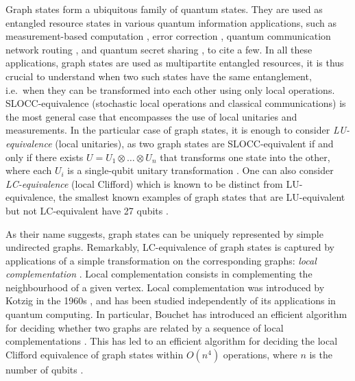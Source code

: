 \documentclass[a4paper,UKenglish,cleveref,autoref,thm-restate]{arxiv}
\begin{document}
Graph states form a ubiquitous family of quantum states. They are used as entangled resource states in various quantum information applications, such as measurement-based computation \cite{raussendorf2001one, raussendorf2003measurement, briegel2009measurement}, error correction \cite{schlingemann2001quantum,schlingemann2001stabilizer,cross2008codeword,sarvepalli2011local}, quantum communication network routing \cite{hahn2019quantum,meignant2019distributing, bravyi2024generating, Cautres2024}, and quantum secret sharing \cite{markham2008graph,gravier2013quantum},  to cite a few.  
In all these applications, graph states are used as multipartite entangled resources, it is thus crucial to understand when two such states have the same entanglement, i.e.~when they can be transformed into each other using only local operations. SLOCC-equivalence (stochastic local operations and classical communications) is the most general case that encompasses the use of local unitaries and measurements. In the particular case of graph states, it is enough to consider \emph{LU-equivalence} (local unitaries), as two graph states are SLOCC-equivalent if and only if there exists $U=U_1\otimes \ldots \otimes U_n$ that transforms one state into the other, where each $U_i$ is a single-qubit unitary transformation \cite{Hein04}. One can also consider \emph{LC-equivalence} (local Clifford) which is known to be distinct from LU-equivalence, the smallest known examples of graph states that are LU-equivalent but not LC-equivalent have 27 qubits \cite{Ji07,Tsimakuridze17}. 

As their name suggests, graph states can be uniquely represented by simple undirected graphs. Remarkably, LC-equivalence of graph states is captured by applications of a simple transformation on the corresponding graphs: \emph{local complementation} \cite{VandenNest04}. Local complementation consists in complementing the neighbourhood of a given vertex. Local complementation was introduced by Kotzig in the 1960s \cite{Kotzig68}, and has been studied independently of its applications in quantum computing. In particular, Bouchet has introduced an efficient algorithm for deciding whether two graphs are related by a sequence of local complementations \cite{Bouchet1991}. This has led to an efficient algorithm for deciding the local Clifford equivalence of graph states within $O(n^4)$ operations, where $n$ is the number of qubits \cite{VdnEfficientLC}. 
\end{document}
